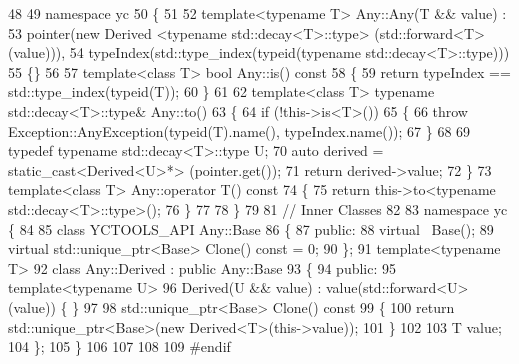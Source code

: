\begin{DoxyCodeInclude}
48 
49 \textcolor{keyword}{namespace }yc
50 \{
51     
52     \textcolor{keyword}{template}<\textcolor{keyword}{typename} T> Any::Any(T && value) :
53         pointer(new Derived <typename std::decay<T>::type> (std::forward<T>(value))),
54         typeIndex(std::type\_index(typeid(typename std::decay<T>::type)))
55     \{\}
56     
57     \textcolor{keyword}{template}<\textcolor{keyword}{class} T> \textcolor{keywordtype}{bool} Any::is()\textcolor{keyword}{ const}
58 \textcolor{keyword}{    }\{
59         \textcolor{keywordflow}{return} typeIndex == std::type\_index(\textcolor{keyword}{typeid}(T));
60     \}
61     
62     \textcolor{keyword}{template}<\textcolor{keyword}{class} T> \textcolor{keyword}{typename} std::decay<T>::type& Any::to()
63     \{
64         \textcolor{keywordflow}{if} (!this->is<T>())
65         \{
66             \textcolor{keywordflow}{throw} Exception::AnyException(\textcolor{keyword}{typeid}(T).name(), typeIndex.name());
67         \}
68         
69         \textcolor{keyword}{typedef} \textcolor{keyword}{typename} std::decay<T>::type U;
70         \textcolor{keyword}{auto} derived = \textcolor{keyword}{static\_cast<}Derived<U>*\textcolor{keyword}{>} (pointer.get());
71         \textcolor{keywordflow}{return} derived->value;
72     \}
73     \textcolor{keyword}{template}<\textcolor{keyword}{class} T> Any::operator T()\textcolor{keyword}{ const}
74 \textcolor{keyword}{    }\{
75         \textcolor{keywordflow}{return} this->to<typename std::decay<T>::type>();
76     \}
77 
78 \}
79 
81 \textcolor{comment}{// Inner Classes}
82 
83 \textcolor{keyword}{namespace }yc \{
84     
85     \textcolor{keyword}{class }YCTOOLS\_API Any::Base
86     \{
87         \textcolor{keyword}{public}:
88         \textcolor{keyword}{virtual} ~Base();
89         \textcolor{keyword}{virtual} std::unique\_ptr<Base> Clone() \textcolor{keyword}{const} = 0;
90     \};
91     \textcolor{keyword}{template}<\textcolor{keyword}{typename} T>
92     \textcolor{keyword}{class }Any::Derived : \textcolor{keyword}{public} Any::Base
93     \{
94     \textcolor{keyword}{public}:
95         \textcolor{keyword}{template}<\textcolor{keyword}{typename} U>
96         Derived(U && value) : value(std::forward<U>(value)) \{ \}
97         
98         std::unique\_ptr<Base> Clone()\textcolor{keyword}{ const}
99 \textcolor{keyword}{        }\{
100             \textcolor{keywordflow}{return} std::unique\_ptr<Base>(\textcolor{keyword}{new} Derived<T>(this->value));
101         \}
102         
103         T value;
104     \};
105 \}
106 
107 
108 
109 \textcolor{preprocessor}{#endif}
\end{DoxyCodeInclude}
